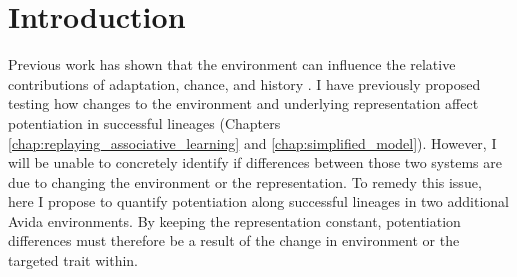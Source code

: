 \section{Introduction}

Previous work has shown that the environment can influence the relative contributions of adaptation, chance, and history \cite{smithFitnessEvolvingBacterial2022}. 
I have previously proposed testing how changes to the environment and underlying representation affect potentiation in successful lineages (Chapters \ref{chap:replaying_associative_learning} and \ref{chap:simplified_model}). 
However, I will be unable to concretely identify if differences between those two systems are due to changing the environment or the representation. 
To remedy this issue, here I propose to quantify potentiation along successful lineages in two additional Avida environments.
By keeping the representation constant, potentiation differences must therefore be a result of the change in environment or the targeted trait within. %



